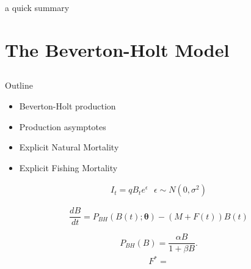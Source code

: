 \documentclass[ xcolor = pdftex, dvipsnames, table ]{beamer}
\begin{document}

%
\begin{frame}
\color{red} a quick summary
\end{frame}

%
\section{The Beverton-Holt Model}
\subsection{}
\begin{frame}{Outline}
\end{frame}

%
\begin{frame}
	\begin{minipage}[h!]{0.49\textwidth}
	\begin{itemize}
	\setlength\itemsep{1em}
	\item Beverton-Holt production	
	\item Production asymptotes
	\item Explicit Natural Mortality
	\item Explicit Fishing Mortality 
	\end{itemize}
	\end{minipage}
	\begin{minipage}[h!]{0.49\textwidth}
        \begin{align*}
        I_t = q B_t e^\epsilon ~~~ \epsilon\sim N(0, \sigma^2)
        \end{align*}

        \begin{equation*}
        \frac{dB}{dt} = P_{BH}(B(t); \bm{\theta}) -(M + F(t))B(t)
        \end{equation*}
	\end{minipage}
\end{frame}

%
\begin{frame}
\begin{minipage}[h!]{0.49\textwidth}
\begin{equation*}
P_{BH}(B) = \frac{\alpha B}{1+\beta B}.
\end{equation*}
\begin{align}
F^* = 
\end{align}
\end{minipage}
\begin{minipage}[h!]{0.49\textwidth}
\end{minipage}
\end{frame}
\end{document}

